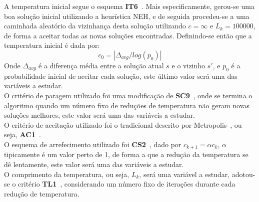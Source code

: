 A temperatura inicial segue o esquema \textbf{IT6}~\cite{franzinRevisitingSimulatedAnnealing2019}. Mais especificamente, gerou-se uma boa solução inicial utilizando a heurística NEH, e de seguida procedeu-se a uma caminhada aleatório da vizinhança desta solução utilizando $c=\infty$ e $L_k=100000$, de forma a aceitar todas as novas soluções encontradas. Definindo-se então que a temperatura inicial é dada por:
$$c_{0}=|\Delta_{avg}/log(p_{0})|$$
Onde $\Delta_{avg}$ é a diferença média entre a solução atual $s$ e o vizinho $s'$, e $p_{0}$ é a probabilidade inicial de aceitar cada solução, este último valor será uma das variáveis a estudar.\\
O critério de paragem utilizado foi uma modificação de \textbf{SC9}~\cite{franzinRevisitingSimulatedAnnealing2019}, onde se termina o algoritmo quando um número fixo de reduções de temperatura não geram novas soluções melhores, este valor será uma das variáveis a estudar.\\
O critério de aceitação utilizado foi o tradicional descrito por Metropolis~\cite{metropolisEquationStateCalculations1953}, ou seja, \textbf{AC1}~\cite{franzinRevisitingSimulatedAnnealing2019}.\\
O esquema de arrefecimento utilizado foi \textbf{CS2}~\cite{franzinRevisitingSimulatedAnnealing2019}, dado por $c_{k+1}=\alpha c_{k}$, $\alpha$ tipicamente é um valor perto de 1, de forma a que a redução da temperatura se dê lentamente, este valor será uma das variáveis a estudar.\\
O comprimento da temperatura, ou seja, $L_{k}$, será uma variável a estudar, adotou-se o critério \textbf{TL1}~\cite{franzinRevisitingSimulatedAnnealing2019}, considerando um número fixo de iterações durante cada redução de temperatura.\\

